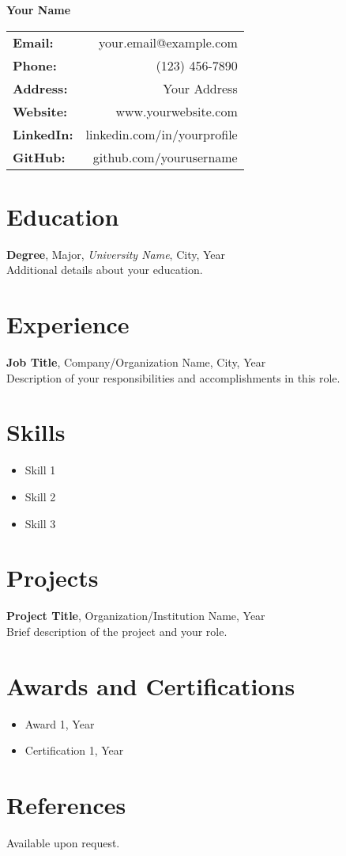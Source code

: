\documentclass{article}
\makeatletter
\newcommand{\fullname}{Your Name}
\newcommand{\email}{your.email@example.com}
\newcommand{\phone}{(123) 456-7890}
\newcommand{\address}{Your Address}
\newcommand{\website}{www.yourwebsite.com}
\newcommand{\linkedin}{linkedin.com/in/yourprofile}
\newcommand{\github}{github.com/yourusername}
\makeatother
\begin{document}
\begin{center}
    \textbf{\Huge \fullname}
\end{center}
\begin{center}
    \begin{tabular}{l r}
        \textbf{Email:} & \email \\
        \textbf{Phone:} & \phone \\
        \textbf{Address:} & \address \\
        \textbf{Website:} & \website \\
        \textbf{LinkedIn:} & \linkedin \\
        \textbf{GitHub:} & \github \\
    \end{tabular}
\end{center}

\section*{Education}
\textbf{Degree}, Major, \textit{University Name}, City, Year \\
Additional details about your education.

\section*{Experience}
\textbf{Job Title}, Company/Organization Name, City, Year \\
Description of your responsibilities and accomplishments in this role.

\section*{Skills}
\begin{itemize}
    \item Skill 1
    \item Skill 2
    \item Skill 3
\end{itemize}

\section*{Projects}
\textbf{Project Title}, Organization/Institution Name, Year \\
Brief description of the project and your role.

\section*{Awards and Certifications}
\begin{itemize}
    \item Award 1, Year
    \item Certification 1, Year
\end{itemize}

\section*{References}
Available upon request.
\end{document}
